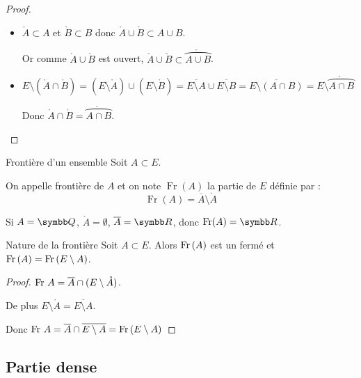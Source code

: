 \begin{proof}
\begin{itemize}
        Donc $\overline {A \cap B} \subset \overline A \cap \overline B$.

        \item $\mathring A \subset A$ et $\mathring B \subset B$ donc $\mathring A \cup \mathring B \subset A \cup B$.

        Or comme $\mathring A \cup \mathring B$ est ouvert, $\mathring A \cup \mathring B \subset \mathring{\overparen{A \cup B}}$.
        
        \item
        $E \setminus (\mathring A \cap \mathring B) = (E \setminus \mathring A) \cup (E \setminus \mathring B) = \overline{E \setminus A} \cup \overline{E \setminus B} = \overline{E \setminus (A \cap B)} = E \setminus \mathring{\overparen{A \cap B}}$

        Donc $\mathring A \cap \mathring B = \mathring{\overparen{A \cap B}}$.
    \end{itemize}
\end{proof}

\begin{definition}{Frontière d'un ensemble}{}
    Soit $A \subset E$. 

    On appelle frontière de $A$ et on note $\operatorname{Fr}(A)$ la partie de $E$ définie par :
    \[\operatorname{Fr}(A) = \overline A \setminus \mathring A\]
\end{definition}

\begin{exemple}
    Si $A = \Q$, 
    $\mathring A = \emptyset$, $\overline A = \R$, donc $\operatorname{Fr}(A) = \R$.
\end{exemple}

\begin{proposition}{Nature de la frontière}{}
    Soit $A \subset E$. Alors $\operatorname{Fr} \,(A)$ est un fermé et $\operatorname{Fr} \,(A) = \operatorname{Fr} \,(E \setminus A)$.
\end{proposition}

\begin{proof}
    $\operatorname{Fr} \, A = \overline A \cap (E \setminus \mathring A)$. 

    De plus $E \setminus \mathring A = \overline{E \setminus A}$.

    Donc $\operatorname{Fr} \, A = \overline A \cap \overline{E \setminus A} = \operatorname{Fr} \, (E \setminus A)$ 
\end{proof}

\subsection{Partie dense}

